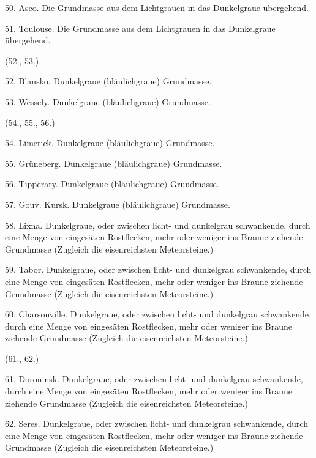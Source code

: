 \documentclass[a4paper, 11pt, oneside, polutonikogreek, german]{article}
\begin{document}
50. Asco. Die Grundmasse aus dem Lichtgrauen in das Dunkelgraue übergehend.

\vspace{2ex}

51. Toulouse. Die Grundmasse aus dem Lichtgrauen in das Dunkelgraue übergehend.

\begin{center}
(52., 53.)
\end{center}

52. Blansko. Dunkelgraue (bläulichgraue) Grundmasse.

53. Wessely. Dunkelgraue (bläulichgraue) Grundmasse.

\begin{center}
(54., 55., 56.)
\end{center}

54. Limerick. Dunkelgraue (bläulichgraue) Grundmasse.

55. Grüneberg. Dunkelgraue (bläulichgraue) Grundmasse.

56. Tipperary. Dunkelgraue (bläulichgraue) Grundmasse.

\vspace{2ex}

57. Gouv. Kursk. Dunkelgraue (bläulichgraue) Grundmasse.

58. Lixna. Dunkelgraue, oder zwischen licht- und dunkelgrau schwankende, durch eine Menge von eingesäten Rostflecken, mehr oder weniger ins Braune ziehende Grundmasse (Zugleich die eisenreichsten Meteorsteine.)

59. Tabor. Dunkelgraue, oder zwischen licht- und dunkelgrau schwankende, durch eine Menge von eingesäten Rostflecken, mehr oder weniger ins Braune ziehende Grundmasse (Zugleich die eisenreichsten Meteorsteine.)

60. Charsonville. Dunkelgraue, oder zwischen licht- und dunkelgrau schwankende, durch eine Menge von eingesäten Rostflecken, mehr oder weniger ins Braune ziehende Grundmasse (Zugleich die eisenreichsten Meteorsteine.)

\begin{center}
(61., 62.)
\end{center}

61. Doroninsk. Dunkelgraue, oder zwischen licht- und dunkelgrau schwankende, durch eine Menge von eingesäten Rostflecken, mehr oder weniger ins Braune ziehende Grundmasse (Zugleich die eisenreichsten Meteorsteine.)

62. Seres. Dunkelgraue, oder zwischen licht- und dunkelgrau schwankende, durch eine Menge von eingesäten Rostflecken, mehr oder weniger ins Braune ziehende Grundmasse (Zugleich die eisenreichsten Meteorsteine.)
\end{document}
